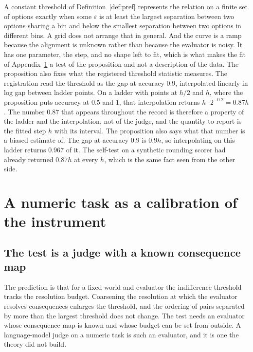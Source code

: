\documentclass{article}
\theoremstyle{definition}
\theoremstyle{remark}
\begin{document}
A constant threshold of Definition~\ref{def:pref} represents the relation on a finite set of options exactly when some $\varepsilon$ is at least the largest separation between two options sharing a bin and below the smallest separation between two options in different bins. A grid does not arrange that in general.
And the curve is a ramp because the alignment is unknown rather than because the evaluator is noisy. It has one parameter, the step, and no shape left to fit, which is what makes the fit of Appendix~\ref{app:numeric} a test of the proposition and not a description of the data.
The proposition also fixes what the registered threshold statistic measures.
The registration read the threshold as the gap at accuracy 0.9, interpolated linearly in log gap between ladder points.
On a ladder with points at $h/2$ and $h$, where the proposition puts accuracy at $0.5$ and $1$, that interpolation returns $h\cdot2^{-0.2}=0.87h$.
The number $0.87$ that appears throughout the record is therefore a property of the ladder and the interpolation, not of the judge, and the quantity to report is the fitted step $h$ with its interval.
The proposition also says what that number is a biased estimate of. The gap at accuracy $0.9$ is $0.9h$, so interpolating on this ladder returns $0.967$ of it.
The self-test on a synthetic rounding scorer had already returned $0.87h$ at every $h$, which is the same fact seen from the other side.

\section{A numeric task as a calibration of the instrument}
\label{app:numeric}

\subsection{The test is a judge with a known consequence map}
\label{sec:test}

The prediction is that for a fixed world and evaluator the indifference threshold tracks the resolution budget.
Coarsening the resolution at which the evaluator resolves consequences enlarges the threshold, and the ordering of pairs separated by more than the largest threshold does not change.
The test needs an evaluator whose consequence map is known and whose budget can be set from outside.
A language-model judge on a numeric task is such an evaluator, and it is one the theory did not build.
\end{document}
